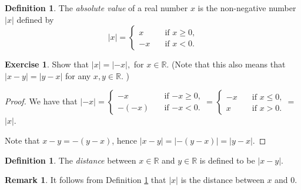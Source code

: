 \documentclass[11pt]{article}
\newcommand{\bbR}{\mathbb{R}}
\newcommand{\abs}[1]{\lvert #1 \rvert}
\theoremstyle{definition}
\newtheorem{definition}[theorem]{Definition}
\newtheorem{exercise}[theorem]{Exercise}
\newtheorem{remark}[theorem]{Remark}
\numberwithin{equation}{section}
\begin{document}
\begin{definition}
	The \emph{absolute value} of a real number $x$ is the non-negative number $\abs{x}$ defined by
	\[
		\abs{x} = \begin{cases}
			x \quad &\text{if $x \geq 0$,} \\
			-x \quad &\text{if $x < 0$.} 
		\end{cases}
	\]
\end{definition}

\begin{exercise}
Show that $\abs{x}=\abs{-x},$ for $x\in \bbR.$  (Note that this also means that $\abs{x-y}=\abs{y-x}$ for any $x,y\in \bbR.$ )


\begin{proof}
We have that $\abs{-x}=\begin{cases}
			-x \quad &\text{if $-x \geq 0$,} \\
			-(-x) \quad &\text{if $-x < 0$.} 
		\end{cases}$ = $\begin{cases}
			-x \quad &\text{if $x \leq 0$,} \\
			x \quad &\text{if $x > 0$.} 
		\end{cases}$ = $\abs{x}$.

Note that $x-y=-(y-x)$, hence $\abs{x-y}=\abs{-(y-x)}=\abs{y-x}$. 


\renewcommand\qedsymbol{QED}
\end{proof}

\end{exercise}

\begin{definition} 
	\label{defn:distance}
	The \emph{distance} between $x \in \bbR$ and $y \in \bbR$ is defined to be $\abs{x - y}$. 
\end{definition}

\begin{remark}
It follows from Definition \ref{defn:distance} that $|x|$ is the distance between $x$ and $0.$
\end{remark}
\end{document}
